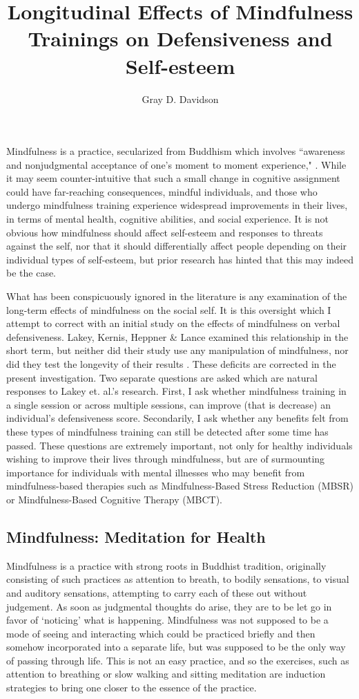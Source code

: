 \documentclass[jou]{apa}
\title{Longitudinal Effects of Mindfulness Trainings on Defensiveness and Self-esteem}
\author{Gray D. Davidson}
\affiliation{Department of Psychology\\ Reed College}
\begin{document}
\maketitle

Mindfulness is a practice, secularized from Buddhism which involves ``awareness and nonjudgmental acceptance of one's moment to moment experience," \cite{keng2011}.  While it may seem counter-intuitive that such a small change in cognitive assignment could have far-reaching consequences, mindful individuals, and those who undergo mindfulness training experience widespread improvements in their lives, in terms of mental health, cognitive abilities, and social experience.  It is not obvious how mindfulness should affect self-esteem and responses to threats against the self, nor that it should differentially affect people depending on their individual types of self-esteem, but prior research has hinted that this may indeed be the case.  

What has been conspicuously ignored in the literature is any examination of the long-term effects of mindfulness on the social self.  It is this oversight which I attempt to correct with an initial study on the effects of mindfulness on verbal defensiveness. Lakey, Kernis, Heppner \& Lance examined this relationship in the short term, but neither did their study use any manipulation of mindfulness, nor did they test the longevity of their results \cite{lakey2008}.  These deficits are corrected in the present investigation.  Two separate questions are asked which are natural responses to Lakey et. al.'s research.  First, I ask whether mindfulness training in a single session or across multiple sessions, can improve (that is decrease) an individual's defensiveness score.  Secondarily, I ask whether any benefits felt from these types of mindfulness training can still be detected after some time has passed.  These questions are extremely important, not only for healthy individuals wishing to improve their lives through mindfulness, but are of surmounting importance for individuals with mental illnesses who may benefit from mindfulness-based therapies such as Mindfulness-Based Stress Reduction (MBSR) or Mindfulness-Based Cognitive Therapy (MBCT).  

\subsection{Mindfulness: Meditation for Health}

Mindfulness is a practice with strong roots in Buddhist tradition, originally consisting of such practices as attention to breath, to bodily sensations, to visual and auditory sensations, attempting to carry each of these out without judgement.  As soon as judgmental thoughts do arise, they are to be let go in favor of `noticing' what is happening.  Mindfulness was not supposed to be a mode of seeing and interacting which could be practiced briefly and then somehow incorporated into a separate life, but was supposed to be the only way of passing through life.  This is not an easy practice, and so the exercises, such as attention to breathing or slow walking and sitting meditation are induction strategies to bring one closer to the essence of the practice.  
\end{document}
